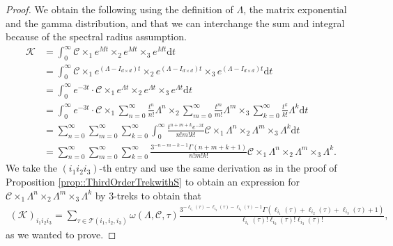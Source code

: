 \documentclass{biometrika}
\begin{document}
\begin{proof}
    We obtain the following using the definition of $\Lambda$, the matrix exponential and the gamma distribution, and that we can interchange the sum and integral 
    because of the spectral radius assumption. 
    \begin{align*}
        \mathcal{K}  &= \int_{0}^{\infty} \mathcal{C} \times_1 e^{M t} \times_2 e^{M t} \times_{3} e^{M t} \mathrm{d} t \\
        &= \int_{0}^{\infty} \mathcal{C} \times_1 e^{(\Lambda - I_{d \times d}) t} \times_2 e^{(\Lambda -I_{d \times d}) t}  \times_{3} e^{(\Lambda - I_{d \times d}) t} \mathrm{d} t \\
        &= \int_{0}^{\infty} e^{-3 t } \cdot \mathcal{C} \times_1 e^{\Lambda t} \times_2 e^{\Lambda t}  \times_{3} e^{\Lambda t} \mathrm{d} t \\
        &= \int_{0}^{\infty} e^{-3 t } \cdot \mathcal{C} \times_1 \sum_{n = 0}^{\infty} \frac{t^n}{n!} \Lambda^n \times_2 
        \sum_{m = 0}^{\infty} \frac{t^m}{m!} \Lambda^m \times_3  \sum_{k = 0}^{\infty} \frac{t^k}{k!} \Lambda^k \mathrm{d} t \\ 
        &= \sum_{n = 0}^{\infty} \sum_{m = 0}^{\infty} \sum_{k = 0}^{\infty} \int_{0}^{\infty} \frac{t^{n+m+k} e^{-3t}}{n! m! k!}  
        \mathcal{C} \times_1  \Lambda^n \times_2 \Lambda^m \times_3  \Lambda^k \mathrm{d} t \\ 
        &=  \sum_{n = 0}^{\infty} \sum_{m = 0}^{\infty} \sum_{k = 0}^{\infty} \frac{3^{-n-m-k-1}  \Gamma(n+m+k+1)}{n! m! k!} 
        \mathcal{C} \times_1  \Lambda^n \times_2 \Lambda^m \times_3  \Lambda^k. 
    \end{align*}
We take the $(i_1 i_2 i_3)$-th entry and use the same derivation as in the proof of Proposition \ref{prop::ThirdOrderTrekwithS} to obtain an expression for  $\mathcal{C} \times_1  \Lambda^n \times_2 \Lambda^m \times_3  \Lambda^k$
by $3$-treks to obtain that 
\begin{align*}
    (\mathcal{K} )_{i_1 i_2 i_3} = \sum_{\tau \in \mathcal{T}(i_1, i_2, i_3)} \omega(\Lambda, \mathcal{C}, \tau)  \frac{3^{-\ell_{i_1}(\tau)-\ell_{i_2}(\tau)-\ell_{i_3}(\tau)-1}  \Gamma(\ell_{i_1}(\tau)+\ell_{i_2}(\tau)+\ell_{i_3}(\tau)+1)}{\ell_{i_1}(\tau)! \ell_{i_2}(\tau)! \ell_{i_3}(\tau)!},
\end{align*}
as we wanted to prove. 
\end{proof}
\end{document}
